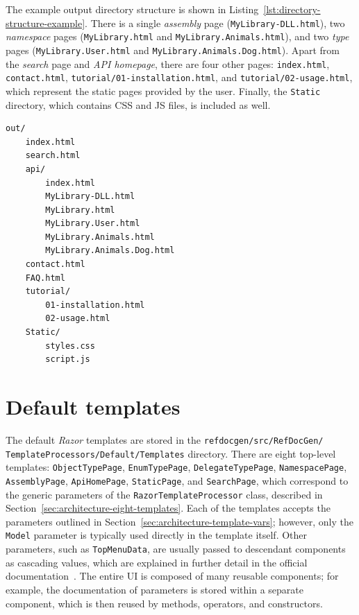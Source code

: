 The example output directory structure is shown in Listing~\ref{lst:directory-structure-example}.
There is a single \textit{assembly} page (\texttt{MyLibrary-DLL.html}), two \textit{namespace} pages (\texttt{MyLibrary.html} and \texttt{MyLibrary.Animals.html}), and two \textit{type} pages (\texttt{MyLibrary.User.html} and \texttt{MyLibrary.Animals.Dog.html}).
Apart from the \textit{search} page and \textit{API homepage}, there are four other pages: \texttt{index.html}, \texttt{contact.html}, \texttt{tutorial/01-installation.html}, and \texttt{tutorial/02-usage.html}, which represent the static pages provided by the user.
Finally, the \texttt{Static} directory, which contains CSS and JS files, is included as well.

\begin{listing}[H]
\begin{lstlisting}
out/
    index.html
    search.html
    api/
        index.html
        MyLibrary-DLL.html
        MyLibrary.html
        MyLibrary.User.html
        MyLibrary.Animals.html
        MyLibrary.Animals.Dog.html
    contact.html
    FAQ.html
    tutorial/
        01-installation.html
        02-usage.html
    Static/
        styles.css
        script.js
\end{lstlisting}
\caption{Example output directory structure}
\label{lst:directory-structure-example}
\end{listing}

\section{Default templates}
\label{sec:default-templates-overview}

The default \textit{Razor} templates are stored in the \texttt{refdocgen/src/RefDocGen/ TemplateProcessors/Default/Templates} directory.
There are eight top-level templates: \texttt{ObjectTypePage}, \texttt{EnumTypePage}, \texttt{DelegateTypePage}, \texttt{Namespace\-Page}, \texttt{AssemblyPage}, \texttt{ApiHomePage}, \texttt{StaticPage}, and \texttt{SearchPage}, which correspond to the generic parameters of the \texttt{RazorTemplateProcessor} class, described in Section~\ref{sec:architecture-eight-templates}.
Each of the templates accepts the parameters outlined in Section~\ref{sec:architecture-template-vars}; however, only the \texttt{Model} parameter is typically used directly in the template itself.
Other parameters, such as \texttt{TopMenuData}, are usually passed to descendant components as cascading values, which are explained in further detail in the official documentation~\cite{razor_cascading_values}.
The entire UI is composed of many reusable components; for example, the documentation of parameters is stored within a separate component, which is then reused by methods, operators, and constructors.

